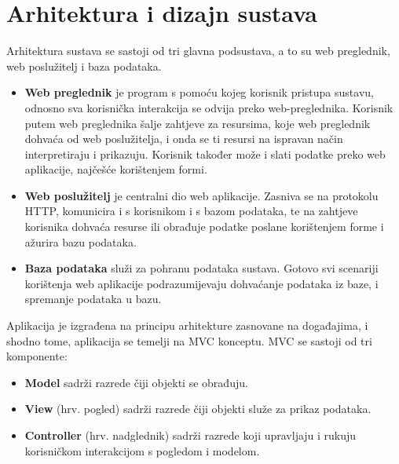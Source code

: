 \chapter{Arhitektura i dizajn sustava}
		
		Arhitektura sustava se sastoji od tri glavna podsustava, a to su web preglednik, web poslužitelj i baza podataka.
		
		\begin{itemize}
		
		\item  \textbf{Web preglednik} je program s pomoću kojeg korisnik pristupa sustavu, odnosno sva korisnička interakcija se odvija preko web-preglednika. Korisnik putem web preglednika šalje zahtjeve za resursima, koje web preglednik dohvaća od web poslužitelja, i onda se ti resursi na ispravan način interpretiraju i prikazuju. Korisnik također može i slati podatke preko web aplikacije, najčešće korištenjem formi.
		
		\item \textbf{Web poslužitelj} je centralni dio web aplikacije. Zasniva se na protokolu HTTP, komunicira i s korisnikom i s bazom podataka, te na zahtjeve korisnika dohvaća resurse ili obrađuje podatke poslane korištenjem forme i ažurira bazu podataka.
		
		\item \textbf{Baza podataka} služi za pohranu podataka sustava. Gotovo svi scenariji korištenja web aplikacije podrazumijevaju dohvaćanje podataka iz baze, i spremanje podataka u bazu.
		\end{itemize}
		
		Aplikacija je izgrađena na principu arhitekture zasnovane na događajima, i shodno tome, aplikacija se temelji na MVC konceptu. MVC se sastoji od tri komponente:	
		
		\begin{itemize}
		
		\item \textbf{Model} sadrži razrede čiji objekti se obrađuju.
		
		\item \textbf{View} (hrv. pogled) sadrži razrede čiji objekti služe za prikaz podataka.
		
		\item \textbf{Controller} (hrv. nadglednik) sadrži razrede koji upravljaju i rukuju korisničkom interakcijom s pogledom i modelom.
		
		\end{itemize}
		
